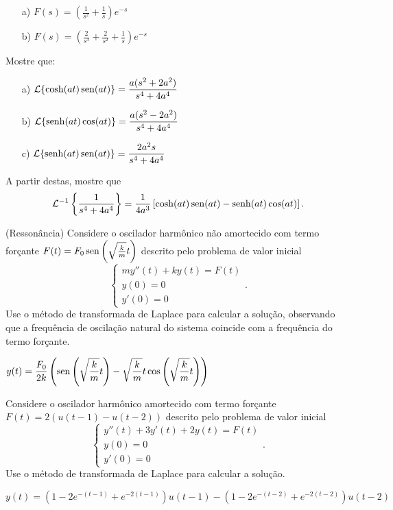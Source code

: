 \begin{Answer}
 \begin{itemize}
  \item[a)] $F(s)=\left(\frac{1}{s^2}+\frac{1}{s}\right)e^{-s}$
      \item[b)] $F(s)=\left(\frac{2}{s^3}+\frac{2}{s^2}+\frac{1}{s}\right)e^{-s}$
 \end{itemize}
\end{Answer}

\begin{Exercise}
Mostre que:
\begin{itemize}
  \item[a)] $\displaystyle \mathcal{L}\{ \cosh (at) \operatorname{sen} (at) \} = \frac{a (s^2 + 2 a^2)}{s^4 + 4a^4}$
  \item[b)] $\displaystyle \mathcal{L} \{ \operatorname{senh} (at) \cos (at) \} = \frac{a (s^2 - 2 a^2)}{s^4 + 4a^4}$
  \item[c)] $\displaystyle \mathcal{L} \{ \operatorname{senh} (at) \operatorname{sen} (at) \} = \frac{2 a^2 s}{s^4 + 4a^4}$
\end{itemize}
 \noindent A partir destas, mostre que $$\mathcal{L}^{-1}\left\{ \frac{1}{s^4 + 4a^4}\right\} = \frac{1}{4a^3} \left[\cosh (at) \operatorname{sen} (at) - \operatorname{senh} (at) \cos(at)\right]. $$
\end{Exercise}


\begin{Exercise}(Ressonância) Considere o oscilador harmônico não amortecido com termo forçante $F(t)=F_0\operatorname{sen}\left(\sqrt{\frac{k}{m}}t\right)$ descrito pelo problema de valor inicial
$$\left\{
\begin{array}{l}
 my''(t)+ky(t)=F(t)\\
 y(0)=0\\
 y'(0)=0
\end{array}
\right..
$$
Use o método de transformada de Laplace para calcular a solução, observando que a frequência de oscilação natural do sistema coincide com a frequência do termo forçante.
\end{Exercise}
\begin{Answer}
$\displaystyle y(t)=\frac{F_0}{2k}\left(\operatorname{sen}\left(\sqrt{\frac{k}{m}}t\right)-\sqrt{\frac{k}{m}}t\cos\left(\sqrt{\frac{k}{m}}t\right)\right)$
\end{Answer}
\begin{Exercise}Considere o oscilador harmônico amortecido com termo forçante $F(t)=2(u(t-1)-u(t-2))$ descrito pelo problema de valor inicial
$$\left\{
\begin{array}{l}
 y''(t)+3y'(t)+2y(t)=F(t)\\
 y(0)=0\\
 y'(0)=0
\end{array}
\right..
$$
Use o método de transformada de Laplace para calcular a solução.
\end{Exercise}
\begin{Answer}
$\displaystyle y(t)=(1-2e^{-(t-1)}+e^{-2(t-1)})u(t-1)-(1-2e^{-(t-2)}+e^{-2(t-2)})u(t-2)$
\end{Answer}

